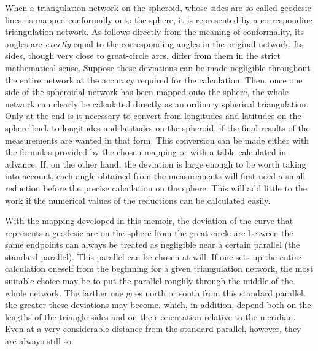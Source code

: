 %
\par\indent When a triangulation network on the spheroid, whose sides are so-called geodesic lines, is mapped conformally onto the sphere, it is represented by a corresponding triangulation network. As follows directly from the meaning of conformality, its angles are \textit{exactly} equal to the corresponding angles in the original network. Its sides, though very close to great-circle arcs, differ from them in the strict mathematical sense. Suppose these deviations can be made negligible throughout the entire network at the accuracy required for the calculation. Then, once one side of the spheroidal network has been mapped onto the sphere, the whole network can clearly be calculated directly as an ordinary spherical triangulation. Only at the end is it necessary to convert from longitudes and latitudes on the sphere back to longitudes and latitudes on the spheroid, if the final results of the measurements are wanted in that form. This conversion can be made either with the formulas provided by the chosen mapping or with a table calculated in advance. If, on the other hand, the deviation is large enough to be worth taking into account, each angle obtained from the measurements will first need a small reduction before the precise calculation on the sphere. This will add little to the work if the numerical values of the reductions can be calculated easily.

With the mapping developed in this memoir, the deviation of the curve that represents a geodesic arc on the sphere from the great-circle arc between the same endpoints can always be treated as negligible near a certain parallel (the standard parallel). This parallel can be chosen at will. If one sets up the entire calculation oneself from the beginning for a given triangulation network, the most suitable choice may be to put the parallel roughly through the middle of the whole network. The farther one goes north or south from this standard parallel. the greater these deviations may become. which, in addition, depend both on the lengths of the triangle sides and on their orientation relative to the meridian. Even at a very considerable distance from the standard parallel, however, they are always still so %
